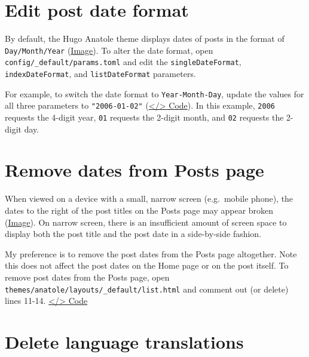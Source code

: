 \documentclass[
]{book}
\begin{document}
\hypertarget{edit-post-date-format}{%
\section{Edit post date format}\label{edit-post-date-format}}

By default, the Hugo Anatole theme displays dates of posts in the format of \texttt{Day/Month/Year} (\href{https://i.imgur.com/k2suw8t.png}{Image}). To alter the date format, open \texttt{config/\_default/params.toml} and edit the \texttt{singleDateFormat}, \texttt{indexDateFormat}, and \texttt{listDateFormat} parameters.

For example, to switch the date format to \texttt{Year-Month-Day}, update the values for all three parameters to \texttt{"2006-01-02"} (\href{https://github.com/dannymorris/r4sites-anatole-custom/blob/master/config/_default/params.toml\#L21-L23}{\textless/\textgreater{} Code}). In this example, \texttt{2006} requests the 4-digit year, \texttt{01} requests the 2-digit month, and \texttt{02} requests the 2-digit day.

\hypertarget{remove-dates-from-posts-page}{%
\section{Remove dates from Posts page}\label{remove-dates-from-posts-page}}

When viewed on a device with a small, narrow screen (e.g.~mobile phone), the dates to the right of the post titles on the Posts page may appear broken (\href{https://i.imgur.com/RznGw5r.png}{Image}). On narrow screen, there is an insufficient amount of screen space to display both the post title and the post date in a side-by-side fashion.

My preference is to remove the post dates from the Posts page altogether. Note this does not affect the post dates on the Home page or on the post itself. To remove post dates from the Posts page, open \texttt{themes/anatole/layouts/\_default/list.html} and comment out (or delete) lines 11-14. \href{https://github.com/dannymorris/r4sites-anatole-custom/blob/master/themes/anatole/layouts/_default/list.html\#L10-L15}{\textless/\textgreater{} Code}

\hypertarget{delete-language-translations}{%
\section{Delete language translations}\label{delete-language-translations}}
\end{document}

